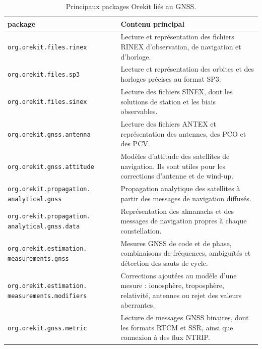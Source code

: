\begin{table}[htbp]
\centering
\small
\begin{tabularx}{\textwidth}{|>{\raggedright\arraybackslash}p{}|
                                  >{\raggedright\arraybackslash}X|}
\hline
\textbf{package} & \textbf{Contenu principal} \\
\hline
\texttt{org.orekit.files.rinex} & Lecture et représentation des fichiers
RINEX d'observation, de navigation et d'horloge.  \\
\hline
\texttt{org.orekit.files.sp3} & Lecture et représentation des orbites et des
horloges précises au format SP3. \\
\hline
\texttt{org.orekit.files.sinex} & Lecture des fichiers SINEX, dont les
solutions de station et les biais observables. \\
\hline
\texttt{org.orekit.gnss.antenna} & Lecture des fichiers ANTEX et
représentation des antennes, des PCO et des PCV. \\
\hline
\texttt{org.orekit.gnss.attitude} & Modèles d'attitude des satellites de
navigation. Ils sont utiles pour les corrections d'antenne et de wind-up. \\
\hline
\texttt{org.orekit.propagation.}\newline
\texttt{analytical.gnss} & Propagation analytique des
satellites à partir des messages de navigation diffusés. \\
\hline
\texttt{org.orekit.propagation.}\newline
\texttt{analytical.gnss.data} & Représentation des
almanachs et des messages de navigation propres à chaque constellation. \\
\hline
\texttt{org.orekit.estimation.}\newline
\texttt{measurements.gnss} & Mesures GNSS de code et de
phase, combinaisons de fréquences, ambiguïtés et détection des sauts de cycle. \\
\hline
\texttt{org.orekit.estimation.}\newline
\texttt{measurements.modifiers} & Corrections ajoutées
au modèle d'une mesure : ionosphère, troposphère, relativité, antennes ou
rejet des valeurs aberrantes. \\
\hline
\texttt{org.orekit.gnss.metric} & Lecture de messages GNSS binaires, dont les formats
RTCM et SSR, ainsi que connexion à des flux NTRIP. \\
\hline
\end{tabularx}
\caption{Principaux packages Orekit liés au GNSS.}
\label{tab:orekit_gnss_packages}
\end{table}


